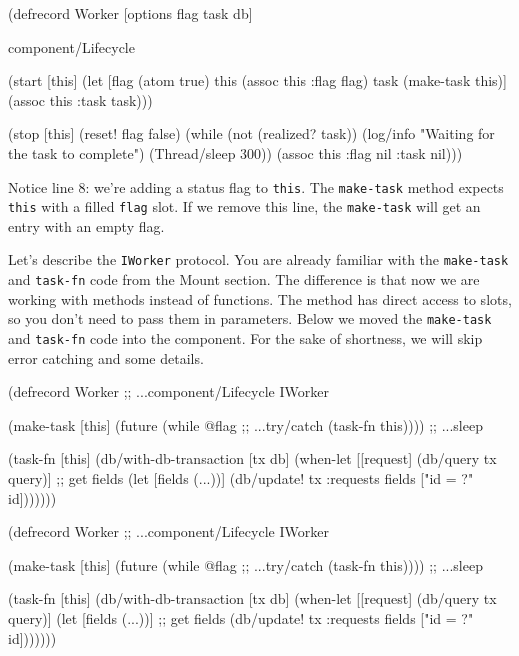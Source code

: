 \begin{english}
  \begin{clojure/lines}
(defrecord Worker
  [options flag task db]

  component/Lifecycle

  (start [this]
    (let [flag (atom true)
          this (assoc this :flag flag)
          task (make-task this)]
      (assoc this :task task)))

  (stop [this]
    (reset! flag false)
    (while (not (realized? task))
      (log/info "Waiting for the task to complete")
      (Thread/sleep 300))
    (assoc this :flag nil :task nil)))
  \end{clojure/lines}
\end{english}

\fi

Notice line 8: we're adding a status flag to \verb|this|. The \verb|make-task| method expects \verb|this| with a filled \verb|flag| slot. If we remove this line, the \verb|make-task| will get an entry with an empty flag.


Let's describe the \verb|IWorker| protocol. You are already familiar with the \verb|make-task| and \verb|task-fn| code from the Mount section. The difference is that now we are working with methods instead of functions. The method has direct access to slots, so you don't need to pass them in parameters. Below we moved the \verb|make-task| and \verb|task-fn| code into the component. For the sake of shortness, we will skip error catching and some details.

\ifnarrow

\begin{english}
  \begin{clojure}
(defrecord Worker
  ;; ...component/Lifecycle
  IWorker

  (make-task [this]
    (future
      (while @flag    ;; ...try/catch
        (task-fn this)))) ;; ...sleep

  (task-fn [this]
    (db/with-db-transaction [tx db]
      (when-let [[request]
                 (db/query tx query)]
        ;; get fields
        (let [fields (...))]
          (db/update! tx :requests
            fields ["id = ?" id]))))))
  \end{clojure}
\end{english}

\else

\begin{english}
  \begin{clojure}
(defrecord Worker
  ;; ...component/Lifecycle
  IWorker

  (make-task [this]
    (future
      (while @flag        ;; ...try/catch
        (task-fn this)))) ;; ...sleep

  (task-fn [this]
    (db/with-db-transaction [tx db]
      (when-let [[request] (db/query tx query)]
        (let [fields (...))] ;; get fields
          (db/update! tx :requests
                      fields ["id = ?" id]))))))
  \end{clojure}
\end{english}

